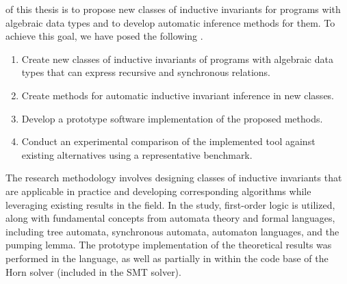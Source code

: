 {\aim} of this thesis is to propose new classes of inductive invariants for programs with algebraic data types and to develop automatic inference methods for them.
To achieve this goal, we have posed the following {\tasks}.
\begin{enumerate}[beginpenalty=10000] %
\item Create new classes of inductive invariants of programs with algebraic data types that can express recursive and synchronous relations.
\item Create methods for automatic inductive invariant inference in new classes.
\item Develop a prototype software implementation of the proposed methods.
\item Conduct an experimental comparison of the implemented tool against existing alternatives using a representative benchmark.
\end{enumerate}

{\methods}
The research methodology involves designing classes of inductive invariants that are applicable in practice and developing corresponding algorithms while leveraging existing results in the field.
In the study, first-order logic is utilized, along with fundamental concepts from automata theory and formal languages, including tree automata, synchronous automata, automaton languages, and the pumping lemma.
The prototype implementation of the theoretical results was performed in the \fsharp{} language, as well as partially in \cplusplus{} within the code base of the \racer{} Horn solver (included in the \zprover{} SMT solver).

